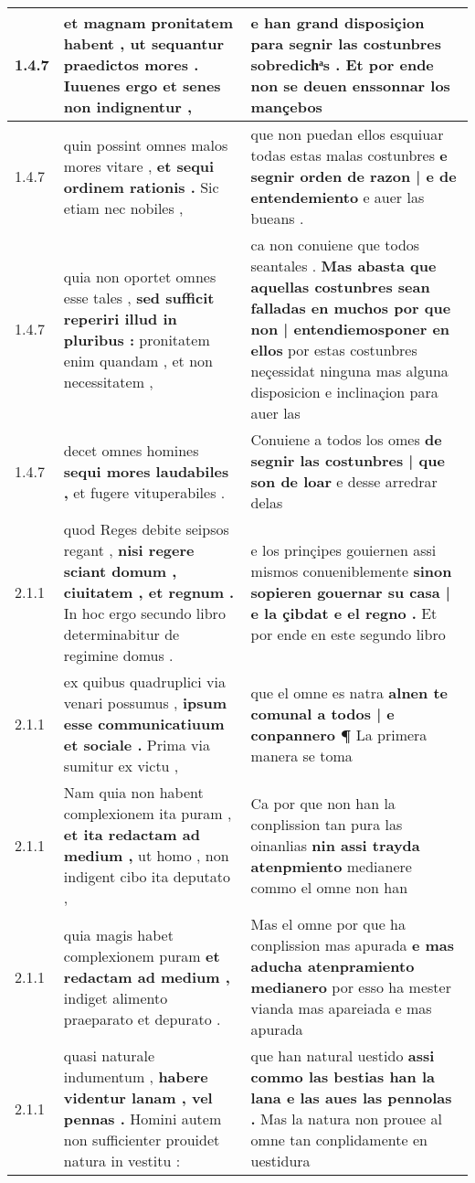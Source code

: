 \begin{tabular}{|p{1cm}|p{6.5cm}|p{6.5cm}|}
1.4.7 & et magnam pronitatem habent , \textbf{ ut sequantur praedictos mores . } Iuuenes ergo et senes non indignentur , & e han grand disposiçion \textbf{ para segnir las costunbres sobredichͣs . } Et por ende non se deuen enssonnar los mançebos \\\hline
1.4.7 & quin possint omnes malos mores vitare , \textbf{ et sequi ordinem rationis . } Sic etiam nec nobiles , & que non puedan ellos esquiuar todas estas malas costunbres \textbf{ e segnir orden de razon | e de entendemiento } e auer las bueans . \\\hline
1.4.7 & quia non oportet omnes esse tales , \textbf{ sed sufficit reperiri illud in pluribus : } pronitatem enim quandam , et non necessitatem , & ca non conuiene que todos seantales . \textbf{ Mas abasta que aquellas costunbres sean falladas en muchos por que non | entendiemosponer en ellos } por estas costunbres neçessidat ninguna mas alguna disposicion e inclinaçion para auer las \\\hline
1.4.7 & decet omnes homines \textbf{ sequi mores laudabiles , } et fugere vituperabiles . & Conuiene a todos los omes \textbf{ de segnir las costunbres | que son de loar } e desse arredrar delas \\\hline
2.1.1 & quod Reges debite seipsos regant , \textbf{ nisi regere sciant domum , ciuitatem , et regnum . } In hoc ergo secundo libro determinabitur de regimine domus . & e los prinçipes gouiernen assi mismos conueniblemente \textbf{ sinon sopieren gouernar su casa | e la çibdat e el regno . } Et por ende en este segundo libro \\\hline
2.1.1 & ex quibus quadruplici via venari possumus , \textbf{ ipsum esse communicatiuum et sociale . } Prima via sumitur ex victu , & que el omne es natra \textbf{ alnen te comunal a todos | e conpannero ¶ } La primera manera se toma \\\hline
2.1.1 & Nam quia non habent complexionem ita puram , \textbf{ et ita redactam ad medium , } ut homo , non indigent cibo ita deputato , & Ca por que non han la conplission tan pura las oinanlias \textbf{ nin assi trayda atenpmiento } medianere commo el omne non han \\\hline
2.1.1 & quia magis habet complexionem puram \textbf{ et redactam ad medium , } indiget alimento praeparato et depurato . & Mas el omne por que ha conplission mas apurada \textbf{ e mas aducha atenpramiento medianero } por esso ha mester vianda mas apareiada e mas apurada \\\hline
2.1.1 & quasi naturale indumentum , \textbf{ habere videntur lanam , vel pennas . } Homini autem non sufficienter prouidet natura in vestitu : & que han natural uestido \textbf{ assi commo las bestias han la lana e las aues las pennolas . } Mas la natura non prouee al omne tan conplidamente en uestidura \\\hline

\end{tabular}
